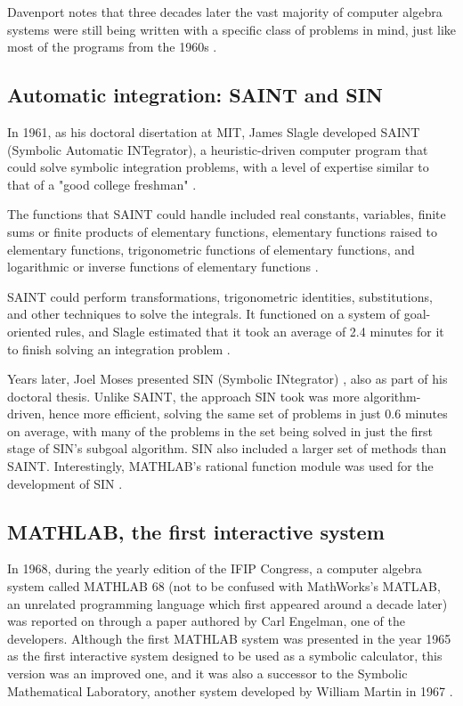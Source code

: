 Davenport notes that three decades later the vast majority of computer algebra systems were still being written with a specific class of problems in mind, just like most of the programs from the 1960s \parencite{davenport1994computer}.

\subsection{Automatic integration: SAINT and SIN}\label{subsec:automatic-integration-saint-and-sin}

In 1961, as his doctoral disertation at MIT, James Slagle developed SAINT (Symbolic Automatic INTegrator), a heuristic-driven computer program that could solve symbolic integration problems, with a level of expertise similar to that of a "good college freshman" \parencite{slagle1963heuristic,geddes1992algorithms}.

The functions that SAINT could handle included real constants, variables, finite sums or finite products of elementary functions, elementary functions raised to elementary functions, trigonometric functions of elementary functions, and logarithmic or inverse functions of elementary functions \parencite{slagle1963heuristic}.

SAINT could perform transformations, trigonometric identities, substitutions, and other techniques to solve the integrals. It functioned on a system of goal-oriented rules, and Slagle estimated that it took an average of 2.4 minutes for it to finish solving an integration problem \parencite{slagle1963heuristic}.

Years later, Joel Moses presented SIN (Symbolic INtegrator) \parencite{moses1967symbolic}, also as part of his doctoral thesis. Unlike SAINT, the approach SIN took was more algorithm-driven, hence more efficient, solving the same set of problems in just 0.6 minutes on average, with many of the problems in the set being solved in just the first stage of SIN's subgoal algorithm. SIN also included a larger set of methods than SAINT. Interestingly, MATHLAB's rational function module was used for the development of SIN \parencite{moses1967symbolic}.

\subsection{MATHLAB, the first interactive system}\label{subsec:mathlab-68-the-first-interactive-system}

In 1968, during the yearly edition of the IFIP Congress, a computer algebra system called MATHLAB 68 (not to be confused with MathWorks's MATLAB, an unrelated programming language which first appeared around a decade later) was reported on through a paper \parencite{engelman1968mathlab} authored by Carl Engelman, one of the developers. Although the first MATHLAB system was presented in the year 1965 as the first interactive system designed to be used as a symbolic calculator, this version was an improved one, and it was also a successor to the Symbolic Mathematical Laboratory, another system developed by William Martin in 1967 \parencite{geddes1992algorithms}.

